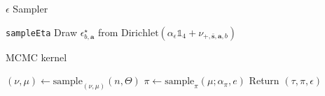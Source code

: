 \documentclass{article}
\newcommand{\code}[1]{\colorbox{light-gray}{\texttt{#1}}}
\newcommand\indexsum[1]{\mathbf{\bar{#1}}}
\newcommand\indexvec[1]{\mathbf{#1}}
\begin{document}
\begin{algorithm}[H]
\caption{$\epsilon$ Sampler }\label{alg:desman_tau}
\begin{algorithmic}
\hfill\code{sampleEta}
        \State Draw $\epsilon^\star_{b,\indexvec{a}}$
        from $\mathrm{Dirichlet}\left(\alpha_\epsilon\mathds{1}_4+\nu_{+,\indexsum{s},\indexvec{a},b}\right)$
    \EndFor
\EndProcedure
\end{algorithmic}
\end{algorithm}



\begin{algorithm}[H]
\caption{MCMC kernel }\label{alg:mcmck}
\begin{algorithmic}
\State $(\nu,\mu)\gets{\mathrm{sample}_{(\nu,\mu)}(n,\Theta)}$
\State $\pi\gets\mathrm{sample}_\pi(\mu;\alpha_\pi,e)$
\State Return $\left(\tau,\pi,\epsilon\right)$
\EndProcedure
\end{algorithmic}
\end{algorithm}
\end{document}
